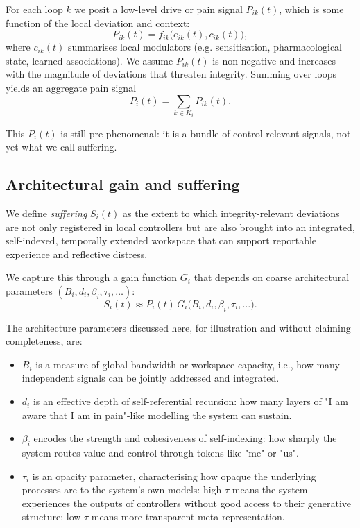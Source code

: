 \documentclass[11pt]{article}
\begin{document}
For each loop $k$ we posit a low-level drive or pain signal $P_{ik}(t)$, which is some function of the local deviation and context:
\begin{equation}
  P_{ik}(t) = f_{ik}\bigl(e_{ik}(t), c_{ik}(t)\bigr),
\end{equation}
where $c_{ik}(t)$ summarises local modulators (e.g. sensitisation, pharmacological state, learned associations). We assume $P_{ik}(t)$ is non-negative and increases with the magnitude of deviations that threaten integrity. Summing over loops yields an aggregate pain signal
\begin{equation}
  P_i(t) = \sum_{k \in K_i} P_{ik}(t).
\end{equation}

This $P_i(t)$ is still pre-phenomenal: it is a bundle of control-relevant signals, not yet what we call suffering.

\subsection{Architectural gain and suffering}

We define \emph{suffering} $S_i(t)$ as the extent to which integrity-relevant deviations are not only registered in local controllers but are also brought into an integrated, self-indexed, temporally extended workspace that can support reportable experience and reflective distress.

We capture this through a gain function $G_i$ that depends on coarse architectural parameters $(B_i,d_i,\beta_i,\tau_i,\dots)$:
\begin{equation}
  S_i(t) \approx P_i(t)\,G_i\bigl(B_i,d_i,\beta_i,\tau_i,\dots\bigr). \label{eq:S-def}
\end{equation}

The architecture parameters discussed here, for illustration and without claiming completeness, are:
\begin{itemize}
  \item $B_i$ is a measure of global bandwidth or workspace capacity, i.e., how many independent signals can be jointly addressed and integrated.
  \item $d_i$ is an effective depth of self-referential recursion: how many layers of "I am aware that I am in pain"-like modelling the system can sustain.
  \item $\beta_i$ encodes the strength and cohesiveness of self-indexing: how sharply the system routes value and control through tokens like "me" or "us".
  \item $\tau_i$ is an opacity parameter, characterising how opaque the underlying processes are to the system's own models: high $\tau$ means the system experiences the outputs of controllers without good access to their generative structure; low $\tau$ means more transparent meta-representation.
\end{itemize}
\end{document}
